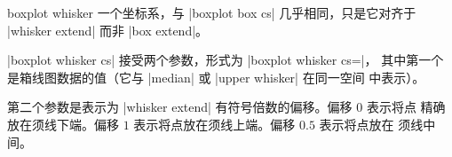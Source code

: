 \begin{coordinatesystem}{boxplot whisker}%
    一个坐标系，与 |boxplot box cs| 几乎相同，只是它对齐于 |whisker extend|
    而非 |box extend|。

   |boxplot whisker cs| 接受两个参数，形式为
   |boxplot whisker cs=|，
   其中第一个是箱线图数据的值（它与 |median| 或 |upper whisker| 在同一空间
   中表示）。

    第二个参数是表示为 |whisker extend| 有符号倍数的偏移。偏移 $0$ 表示将点
    精确放在须线下端。偏移 $1$ 表示将点放在须线上端。偏移 $0.5$ 表示将点放在
    须线中间。
\begin{codeexample}[]
\end{codeexample}
\end{coordinatesystem}

%
%
%


